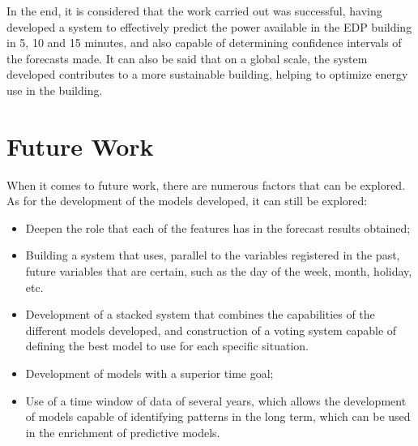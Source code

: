 In the end, it is considered that the work carried out was successful, having developed a system to effectively predict the power available in the \ac{EDP} building in 5, 10 and 15 minutes, and also capable of determining confidence intervals of the forecasts made. It can also be said that on a global scale, the system developed contributes to a more sustainable building, helping to optimize energy use in the building.



\newpage
\section{Future Work}

When it comes to future work, there are numerous factors that can be explored. As for the development of the models developed, it can still be explored: 

\begin{itemize}
\setlength\itemsep{0.1em}
    \item Deepen the role that each of the features has in the forecast results obtained;
    \item Building a system that uses, parallel to the variables registered in the past, future variables that are certain, such as the day of the week, month, holiday, etc.
    \item Development of a stacked system that combines the capabilities of the different models developed, and construction of a voting system capable of defining the best model to use for each specific situation.
    \item Development of models with a superior time goal;
    \item Use of a time window of data of several years, which allows the development of models capable of identifying patterns in the long term, which can be used in the enrichment of predictive models.
\end{itemize}